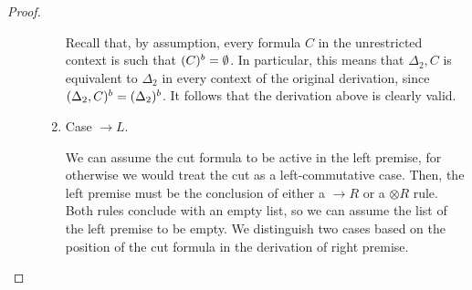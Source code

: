 \begin{proof}
\begin{description}
\begin{enumerate}
      Recall that, by assumption, every formula $C$ in the unrestricted context
      is such that $(C)^{b} = \emptyset$. In particular, this means that
      $\Delta_2,C$ is equivalent to $\Delta_2$ in every context of the original
      derivation, since $(\Delta_2,C)^{b} = (\Delta_2)^{b}$. It
      follows that the derivation above is clearly valid.

    \item Case $\rightarrow L$.

      We can assume the cut formula to be active in the left premise, for
      otherwise we would treat the cut as a left-commutative case.  Then, the
      left premise must be the conclusion of either a $\rightarrow R$ or a
      $\otimes R$ rule. Both rules conclude with an empty list, so we can assume
      the list of the left premise to be empty. We distinguish two cases based
      on the position of the cut formula in the derivation of right premise.

\end{enumerate}
\end{description}
\end{proof}
